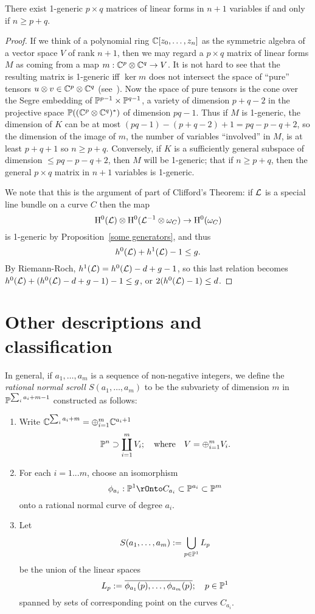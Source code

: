 \begin{fact} There exist 1-generic $p\times q$ matrices of linear forms in $n+1$ variables if and only if $n\geq p+q$.

\begin{proof}
If we think of a polynomial ring $\CC[z_0,\dots,z_n]$ as the symmetric algebra
of a vector space $V$ of rank $n+1$, then we may regard a $p\times q$ matrix of
linear forms $M$ as coming from a map $m: \CC^{p}\otimes \CC^{q}\to V$. It is not hard to see that the
resulting matrix is 1-generic iff $\ker m$ does not intersect the space of ``pure'' tensors
$u\otimes v\in \CC^p\otimes \CC^q$ (see~\cite{Eisenbud-Resilient}). Now the space of pure tensors is the cone over the Segre embedding of $\PP^{p-1}\times\PP^{q-1}$, a variety of dimension 
$p+q-2$ in the projective space $\PP((\CC^{p}\otimes \CC^{q})^*)$ of dimension
$pq-1$. Thus if $M$ is 1-generic, the dimension of $K$ can be at most
$(pq-1)-(p+q-2)+1 = pq-p-q+2$, so the dimension of the image of $m$, the number of variables
``involved'' in $M$, is at least $p+q+1$ so $n\geq p+q$. Conversely, if $K$ is a sufficiently general
subspace of dimension $\leq pq-p-q+2$, then $M$ will be 1-generic; that if $n\geq p+q$, then the general $p\times q$ matrix in $n+1$ variables is 1-generic.

We note that this is the argument of part of Clifford's Theorem: if $\cL$ is a special
line bundle on a curve $C$ then the map 
$$
\HH^0(\cL) \otimes \HH^0(\cL^{-1}\otimes \omega_C) \to \HH^0 (\omega_C)
$$
is 1-generic by Proposition~\ref{some generators}, and thus
$$
h^0(\cL)+h^1(\cL)-1 \leq g.
$$
By Riemann-Roch,  $h^1(\cL) = h^0(\cL) -d+g-1$, so this last relation becomes
$h^0(\cL)+(h^0(\cL) -d+g-1) -1 \leq g$, or $2(h^0(\cL)-1) \leq d$.
\end{proof}
\end{fact}

\section{Other descriptions and classification}
In general, if $a_1,\dots, a_m$ is a sequence of non-negative integers, we define the  \emph{rational normal scroll $S(a_1,\dots, a_m)$} 
to be the subvariety of dimension $m$ in $\PP^{\sum_i a_i+m-1}$ constructed as follows:

\begin{enumerate}
 \item Write $\CC^{\sum_i a_i+m} = \oplus_{i=1}^m\CC^{a_i+1}$ 
$$
\PP^n \supset \coprod_{i= 1}^m V_i; \quad \hbox{where} \quad V = \oplus_{i= 1}^m V_i.
$$
\item For each $i = 1...m$, choose an isomorphism 
$$
\phi_{a_i}:\PP^1\rOnto C_{a_i}\subset \PP^{a_i}\subset \PP^m
$$ 
onto a rational normal curve of degree $a_i$.
\item Let 
$$
S(a_1,\dots,a_m) := \bigcup_{p\in \PP^1} L_p
$$
 be the union of the linear spaces 
$$
L_p := \overline{\phi_{a_1}(p), \dots, \phi_{a_m}(p)}; \quad p\in \PP^1
$$
spanned by sets of corresponding point on the curves $C_{a_i}$.
\end{enumerate}

